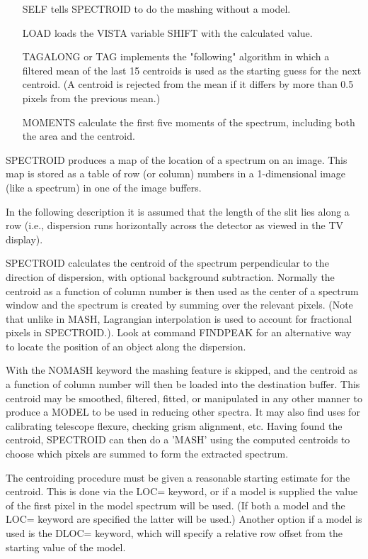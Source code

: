\begin{itemize}
{       for debugging purposes.}
  \item[SELF]{tells SPECTROID to do the mashing without a model.}
  \item[LOAD]{loads the VISTA variable SHIFT with the calculated value.}
  \item[TAGALONG or TAG]{implements the "following" algorithm in which a
       filtered mean of the last 15 centroids is used as the starting guess
       for the next centroid.  (A centroid is rejected from the mean if it
       differs by more than 0.5 pixels from the previous mean.)}
  \item[MOMENTS]{calculate the first five moments of the spectrum,
       including both the area and the centroid.}
\end{itemize}

SPECTROID produces a map of the location of a spectrum on an image.  This
map is stored as a table of row (or column) numbers in a 1-dimensional
image (like a spectrum) in one of the image buffers.

In the following description it is assumed that the length of the slit lies
along a row (i.e., dispersion runs horizontally across the detector as
viewed in the TV display).

SPECTROID calculates the centroid of the spectrum perpendicular to the
direction of dispersion, with optional background subtraction.  Normally
the centroid as a function of column number is then used as the center of a
spectrum window and the spectrum is created by summing over the relevant
pixels.  (Note that unlike in MASH, Lagrangian interpolation is used to
account for fractional pixels in SPECTROID.). Look at command FINDPEAK for
an alternative way to locate the position of an object along the
dispersion.

With the NOMASH keyword the mashing feature is skipped, and the centroid as
a function of column number will then be loaded into the destination
buffer.  This centroid may be smoothed, filtered, fitted, or manipulated in
any other manner to produce a MODEL to be used in reducing other spectra.
It may also find uses for calibrating telescope flexure, checking grism
alignment, etc. Having found the centroid, SPECTROID can then do a 'MASH'
using the computed centroids to choose which pixels are summed to form the
extracted spectrum.

The centroiding procedure must be given a reasonable starting estimate for
the centroid.  This is done via the LOC= keyword, or if a model is supplied
the value of the first pixel in the model spectrum will be used.  (If both
a model and the LOC= keyword are specified the latter will be used.)
Another option if a model is used is the DLOC= keyword, which will specify
a relative row offset from the starting value of the model.

